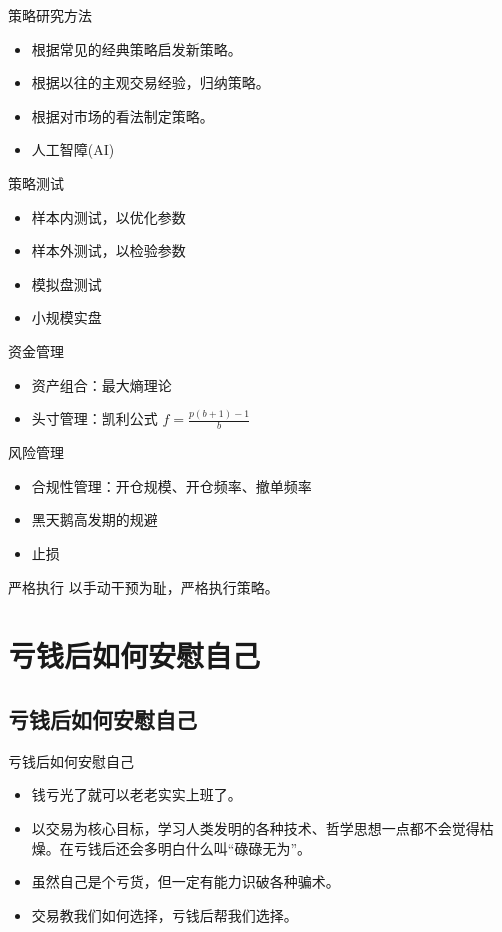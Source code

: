 \documentclass{beamer}
\begin{document}
\begin{frame}{策略研究方法}
  \begin{itemize}
    \item 根据常见的经典策略启发新策略。
    \item 根据以往的主观交易经验，归纳策略。
    \item 根据对市场的看法制定策略。
    \item 人工智障(AI)
  \end{itemize}
\end{frame}

\begin{frame}{策略测试}
  \begin{itemize}
    \item 样本内测试，以优化参数
    \item 样本外测试，以检验参数
    \item 模拟盘测试
    \item 小规模实盘
  \end{itemize}
\end{frame}

\begin{frame}{资金管理}
  \begin{itemize}
    \item 资产组合：最大熵理论
    \item 头寸管理：凯利公式
      $f=\frac{p(b+1)-1}{b}$
  \end{itemize}
\end{frame}

\begin{frame}{风险管理}
  \begin{itemize}
    \item 合规性管理：开仓规模、开仓频率、撤单频率
    \item 黑天鹅高发期的规避
    \item 止损
  \end{itemize}
\end{frame}

\begin{frame}{严格执行}
  以手动干预为耻，严格执行策略。
\end{frame}

\section{亏钱后如何安慰自己}
\subsection{亏钱后如何安慰自己}
\begin{frame}{亏钱后如何安慰自己}
  \begin{itemize}
    \item 钱亏光了就可以老老实实上班了。
    \item 以交易为核心目标，学习人类发明的各种技术、哲学思想一点都不会觉得枯燥。在亏钱后还会多明白什么叫“碌碌无为”。
    \item 虽然自己是个亏货，但一定有能力识破各种骗术。
    \item 交易教我们如何选择，亏钱后帮我们选择。
  \end{itemize}
\end{frame}
\end{document}

